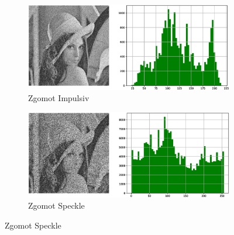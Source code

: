\documentclass[12pt]{article}
\begin{document}
\begin{figure}[h!]
    \begin{subfigure}{0.49\textwidth}
        \centering
        \includegraphics[width=\textwidth]{images/Impulsiv_plot.eps}
        \caption{Zgomot Impulsiv}
        \label{fig:img6}
    \end{subfigure}
	\hspace{10pt} 
    \begin{subfigure}{0.49\textwidth}
        \centering
        \includegraphics[width=\textwidth]{images/Speckle_plot.eps}
        \caption{Zgomot Speckle}
        \label{fig:img7}
    \end{subfigure}
    \vspace{10pt} 


\end{figure}
\end{document}
